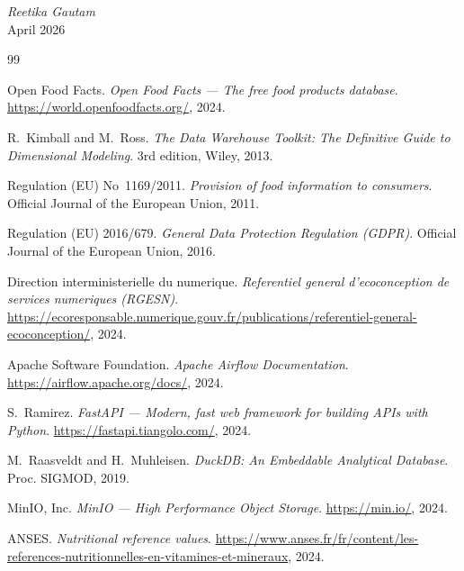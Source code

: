 \documentclass[a4paper,11pt,oneside,openany]{report}
\begin{document}
\begin{center}
\textit{Reetika Gautam} \\
April 2026
\end{center}

\clearpage


\begin{thebibliography}{99}

Open Food Facts.
\textit{Open Food Facts --- The free food products database}.
\url{https://world.openfoodfacts.org/}, 2024.

R.~Kimball and M.~Ross.
\textit{The Data Warehouse Toolkit: The Definitive Guide to Dimensional
Modeling}. 3rd edition, Wiley, 2013.

Regulation (EU) No~1169/2011.
\textit{Provision of food information to consumers}.
Official Journal of the European Union, 2011.

Regulation (EU) 2016/679.
\textit{General Data Protection Regulation (GDPR)}.
Official Journal of the European Union, 2016.

Direction interministerielle du numerique.
\textit{Referentiel general d'ecoconception de services numeriques
(RGESN)}.
\url{https://ecoresponsable.numerique.gouv.fr/publications/referentiel-general-ecoconception/}, 2024.

Apache Software Foundation.
\textit{Apache Airflow Documentation}.
\url{https://airflow.apache.org/docs/}, 2024.

S.~Ramirez.
\textit{FastAPI --- Modern, fast web framework for building APIs with Python}.
\url{https://fastapi.tiangolo.com/}, 2024.

M.~Raasveldt and H.~Muhleisen.
\textit{DuckDB: An Embeddable Analytical Database}.
Proc. SIGMOD, 2019.

MinIO, Inc.
\textit{MinIO --- High Performance Object Storage}.
\url{https://min.io/}, 2024.

ANSES.
\textit{Nutritional reference values}.
\url{https://www.anses.fr/fr/content/les-references-nutritionnelles-en-vitamines-et-mineraux}, 2024.

\end{thebibliography}
\end{document}
